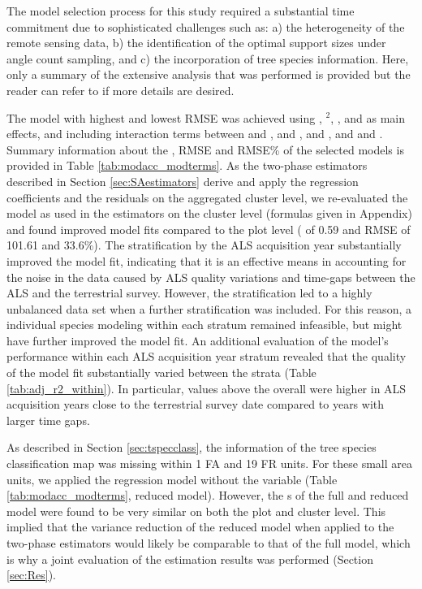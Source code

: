 The model selection process for this study required a substantial time commitment due to sophisticated challenges such as: a) the heterogeneity of the remote sensing data, b) the identification of the optimal support sizes under angle count sampling, and c) the incorporation of tree species information. Here, only a summary of the extensive analysis that was performed is provided but the reader can refer to \citet{hill2017a} if more details are desired.\par
The model with highest \adjrsq{} and lowest RMSE was achieved using \meanheight{}, \meanheight{}$^2$, \stddev{}, \alsyear{} and \treespecies{} as main effects, and including interaction terms between \meanheight{} and \alsyear{}, \stddev{} and \alsyear{}, \meanheight{} and \stddev{}, and \meanheight{} and \treespecies{}. Summary information about the \adjrsq{}, RMSE and RMSE\% of the selected models is provided in Table \ref{tab:modacc_modterms}. As the two-phase estimators described in Section \ref{sec:SAestimators} derive and apply the regression coefficients and the residuals on the aggregated cluster level, we re-evaluated the model as used in the estimators on the cluster level (formulas given in Appendix) and found improved model fits compared to the plot level (\adjrsq{} of 0.59 and RMSE of 101.61 \mha{} and 33.6\%). The stratification by the ALS acquisition year substantially improved the model fit, indicating that it is an effective means in accounting for the noise in the data caused by ALS quality variations and time-gaps between the ALS and the terrestrial survey. However, the stratification led to a highly unbalanced data set when a further \treespecies{} stratification was included. For this reason, a individual species modeling within each \alsyear{} stratum remained infeasible, but might have further improved the model fit. An additional evaluation of the model's performance within each ALS acquisition year stratum revealed that the quality of the model fit substantially varied between the strata (Table \ref{tab:adj_r2_within}). In particular, values above the overall \adjrsq{} were higher in ALS acquisition years close to the terrestrial survey date compared to years with larger time gaps.\par
As described in Section \ref{sec:tspecclass}, the information of the tree species classification map was missing within 1 FA and 19 FR units. For these small area units, we applied the regression model without the \treespecies{} variable (Table \ref{tab:modacc_modterms}, reduced model). However, the \adjrsq{}s of the full and reduced model were found to be very similar on both the plot and cluster level. This implied that the variance reduction of the reduced model when applied to the two-phase estimators would likely be comparable to that of the full model, which is why a joint evaluation of the estimation results was performed (Section \ref{sec:Res}).

